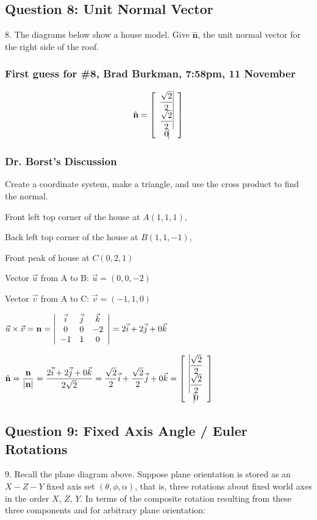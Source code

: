 \documentclass[11pt]{article}
\begin{document}
\begin{spacing}{1.2}
\subsection{Question 8:  Unit Normal Vector}
8.  The diagrams below show a house model.  Give $\hat{\mathbf{n}}$, the unit normal vector for the right side of the roof.  

\subsubsection{First guess for \#8, Brad Burkman, 7:58pm, 11 November}
$$\hat{\mathbf{n}} = 
\left[
\begin{array}{>{\displaystyle}c<{\vrule width 0pt height 24pt depth 8pt}}
	 \frac{\sqrt2}{2}\cr
	 \frac{\sqrt2}{2}\cr
	 0 
\end{array}
\right]
$$

\subsubsection{Dr. Borst's Discussion}

Create a coordinate system, make a triangle, and use the cross product to find the normal.  

Front left top corner of the house at $A(1,1,1)$,

Back left top corner of the house at $B(1,1,-1)$,

Front peak of house at $\displaystyle C\left( 0,2, 1\right)$

Vector $\vec{u}$ from A to B: $\vec{u} = (0,0,-2)$

Vector $\vec{v}$ from A to C:  $\displaystyle\vec{v} = \left( -1,1, 0 \right)$

$\displaystyle
\vec{u} \times \vec{v} = {\mathbf{n}} = 
\left|
	\begin{array}{ccc}
		\vec{i} & \vec{j} & \vec{k} \cr
		0 & 0 & -2 \cr
		-1 & 1 & 0 \cr
	\end{array}
\right|
= 2\vec{i}  +2\vec{j} + 0\vec{k}
$

$\displaystyle
\hat{\mathbf{n}} = 
\frac{\mathbf{n}}{|\mathbf{n}|}
= \frac{2\vec{i} + 2 \vec{j} + 0 \vec{k}}{2\sqrt2} = \frac{\sqrt2}{2}\vec{i} + \frac{\sqrt2}{2} \vec{j} + 0 \vec{k}
=
\left[
	\begin{array}{>{\displaystyle\vrule width 0pt height 16pt depth 12pt}c}
		\frac{\sqrt2}{2} \cr
		\frac{\sqrt2}{2} \cr
		0 \cr
	\end{array}
\right]
$

\subsection{Question 9:  Fixed Axis Angle / Euler Rotations}
9.  Recall the plane diagram above.  Suppose plane orientation is stored as an $X-Z-Y$ fixed axis set $(\theta, \phi, \alpha)$, that is, three rotations about fixed world axes in the order $X$, $Z$, $Y$.  In terms of the composite rotation resulting from these three components and for arbitrary plane orientation:


\end{spacing}
\end{document}
